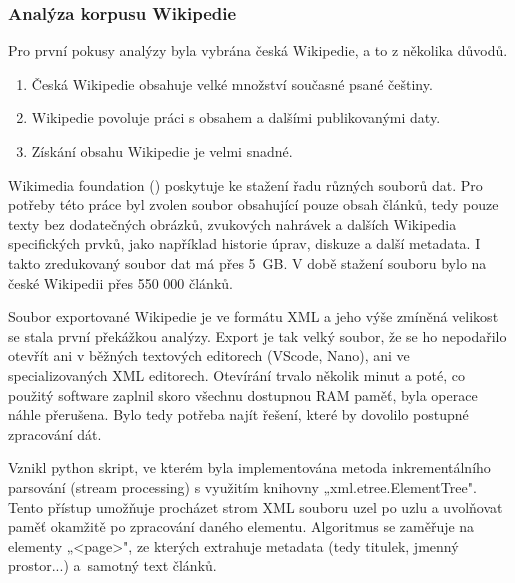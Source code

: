 \documentclass[a4paper, twoside, 12pt, czech]{article}
\begin{document}
\subsubsection{Analýza korpusu Wikipedie}
Pro první pokusy analýzy byla vybrána česká Wikipedie, a to z několika
důvodů.
\begin{enumerate}
    \item Česká Wikipedie obsahuje velké množství současné psané češtiny.
    \item Wikipedie povoluje práci s obsahem a dalšími publikovanými daty.
    \item Získání obsahu Wikipedie je velmi snadné.
\end{enumerate}
Wikimedia foundation (\cite{wikidump}) poskytuje ke stažení řadu různých souborů 
dat. Pro potřeby této práce byl zvolen soubor obsahující pouze obsah článků, 
tedy pouze texty bez dodatečných obrázků, zvukových nahrávek a dalších Wikipedia 
specifických prvků, jako například historie úprav, diskuze a další metadata. I 
takto zredukovaný soubor dat má přes 5~GB. V době stažení souboru bylo na české 
Wikipedii přes 550 000 článků. 

Soubor exportované Wikipedie je ve formátu XML a jeho výše zmíněná velikost se 
stala první překážkou analýzy. Export je tak velký soubor, že se ho nepodařilo 
otevřít ani v běžných textových editorech (VScode, Nano), ani ve specializovaných 
XML editorech. Otevírání trvalo několik minut a poté, co použitý software zaplnil 
skoro všechnu dostupnou RAM paměť, byla operace náhle přerušena. Bylo tedy 
potřeba najít řešení, které by dovolilo postupné zpracování dát.


Vznikl python skript, ve kterém byla implementována metoda inkrementálního 
parsování (stream processing) s využitím knihovny „xml.etree.ElementTree". %
Ten\-to přístup umožňuje procházet strom XML souboru uzel po uzlu a uvolňovat paměť 
okamžitě po zpracování daného elementu. Algoritmus se zaměřuje na elementy 
„\textless page\textgreater", ze kterých extrahuje metadata (tedy titulek, jmenný prostor...) 
a~samotný text článků.
\end{document}
